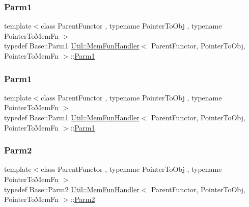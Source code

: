 \subsubsection{\texorpdfstring{Parm1}{Parm1}\hspace{0.1cm}{\footnotesize\ttfamily [2/3]}}
{\footnotesize\ttfamily template$<$class Parent\+Functor , typename Pointer\+To\+Obj , typename Pointer\+To\+Mem\+Fn $>$ \\
typedef Base\+::\+Parm1 \mbox{\hyperlink{classUtil_1_1MemFunHandler}{Util\+::\+Mem\+Fun\+Handler}}$<$ Parent\+Functor, Pointer\+To\+Obj, Pointer\+To\+Mem\+Fn $>$\+::\mbox{\hyperlink{classUtil_1_1MemFunHandler_a43182733677fc623d89e5613ecf15761}{Parm1}}}

\mbox{\label{classUtil_1_1MemFunHandler_a43182733677fc623d89e5613ecf15761}} 
\subsubsection{\texorpdfstring{Parm1}{Parm1}\hspace{0.1cm}{\footnotesize\ttfamily [3/3]}}
{\footnotesize\ttfamily template$<$class Parent\+Functor , typename Pointer\+To\+Obj , typename Pointer\+To\+Mem\+Fn $>$ \\
typedef Base\+::\+Parm1 \mbox{\hyperlink{classUtil_1_1MemFunHandler}{Util\+::\+Mem\+Fun\+Handler}}$<$ Parent\+Functor, Pointer\+To\+Obj, Pointer\+To\+Mem\+Fn $>$\+::\mbox{\hyperlink{classUtil_1_1MemFunHandler_a43182733677fc623d89e5613ecf15761}{Parm1}}}

\mbox{\label{classUtil_1_1MemFunHandler_a9d454c62047cb4bff3173b5bda9a38c8}} 
\subsubsection{\texorpdfstring{Parm2}{Parm2}\hspace{0.1cm}{\footnotesize\ttfamily [1/3]}}
{\footnotesize\ttfamily template$<$class Parent\+Functor , typename Pointer\+To\+Obj , typename Pointer\+To\+Mem\+Fn $>$ \\
typedef Base\+::\+Parm2 \mbox{\hyperlink{classUtil_1_1MemFunHandler}{Util\+::\+Mem\+Fun\+Handler}}$<$ Parent\+Functor, Pointer\+To\+Obj, Pointer\+To\+Mem\+Fn $>$\+::\mbox{\hyperlink{classUtil_1_1MemFunHandler_a9d454c62047cb4bff3173b5bda9a38c8}{Parm2}}}

